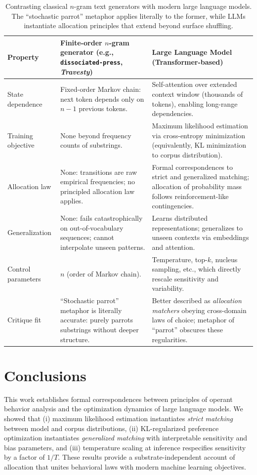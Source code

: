 \documentclass[11pt]{article}
\begin{document}
\begin{table}[ht]
\centering
\begin{tabular}{|p{}|p{}|p{}|}
\hline
\textbf{Property} & \textbf{Finite-order $n$-gram generator (e.g., \texttt{dissociated-press}, \emph{Travesty})} & \textbf{Large Language Model (Transformer-based)} \\
\hline
State dependence &
Fixed-order Markov chain: next token depends only on $n-1$ previous tokens. &
Self-attention over extended context window (thousands of tokens), enabling long-range dependencies. \\
\hline
Training objective &
None beyond frequency counts of substrings. &
Maximum likelihood estimation via cross-entropy minimization (equivalently, KL minimization to corpus distribution). \\
\hline
Allocation law &
None: transitions are raw empirical frequencies; no principled allocation law applies. &
Formal correspondences to strict and generalized matching; allocation of probability mass follows reinforcement-like contingencies. \\
\hline
Generalization &
None: fails catastrophically on out-of-vocabulary sequences; cannot interpolate unseen patterns. &
Learns distributed representations; generalizes to unseen contexts via embeddings and attention. \\
\hline
Control parameters &
$n$ (order of Markov chain). &
Temperature, top-$k$, nucleus sampling, etc., which directly rescale sensitivity and variability. \\
\hline
Critique fit &
``Stochastic parrot'' metaphor is literally accurate: purely parrots substrings without deeper structure. &
Better described as \emph{allocation matchers} obeying cross-domain laws of choice; metaphor of ``parrot'' obscures these regularities. \\
\hline
\end{tabular}
\caption{Contrasting classical $n$-gram text generators with modern large language models. The ``stochastic parrot'' metaphor applies literally to the former, while LLMs instantiate allocation principles that extend beyond surface shuffling.}
\label{tab:ngram_vs_llm}
\end{table}


\section{Conclusions}

This work establishes formal correspondences between principles of operant
behavior analysis and the optimization dynamics of large language models. We
showed that (i) maximum likelihood estimation instantiates \emph{strict
matching} between model and corpus distributions, (ii) KL-regularized preference
optimization instantiates \emph{generalized matching} with interpretable
sensitivity and bias parameters, and (iii) temperature scaling at inference
respecifies sensitivity by a factor of $1/T$. These results provide a
substrate-independent account of allocation that unites behavioral laws with
modern machine learning objectives.
\end{document}
